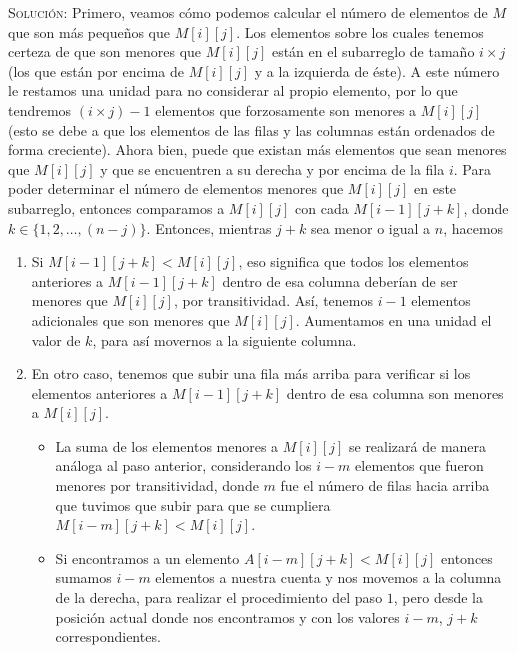\documentclass[letterpaper,11pt]{article}
\begin{document}
\begin{enumerate}
\begin{enumerate}
        \textsc{Solución:} Primero, veamos cómo podemos calcular el número de 
        elementos de $M$ que son más pequeños que $M[i][j]$. Los elementos sobre 
        los cuales tenemos certeza de que son menores que $M[i][j]$ están en el 
        subarreglo de tamaño $i \times j$ (los que están por encima de $M[i][j]$
        y a la izquierda de éste). A este número le restamos una unidad para no 
        considerar al propio elemento, por lo que tendremos $(i \times j) - 1$
        elementos que forzosamente son menores a $M[i][j]$ (esto se debe a que 
        los elementos de las filas y las columnas están ordenados de forma 
        creciente). Ahora bien, puede que existan más elementos que sean menores 
        que $M[i][j]$ y que se encuentren a su derecha y por encima de la fila 
        $i$. Para poder determinar el número de elementos menores que $M[i][j]$
        en este subarreglo, entonces comparamos a $M[i][j]$ con cada 
        $M[i-1][j+k]$, donde $k \in \{1, 2, \ldots, (n-j)\}$. Entonces, mientras 
        $j+k$ sea menor o igual a $n$, hacemos 
        \begin{enumerate}
            \item Si $M[i-1][j+k] < M[i][j]$, eso significa que todos los 
            elementos anteriores a $M[i-1][j+k]$ dentro de esa columna deberían 
            de ser menores que $M[i][j]$, por transitividad. Así, tenemos $i-1$ 
            elementos adicionales que son menores que $M[i][j]$. Aumentamos en 
            una unidad el valor de $k$, para así movernos a la siguiente columna.

            \item En otro caso, tenemos que subir una fila más arriba para 
            verificar si los elementos anteriores a $M[i-1][j+k]$ dentro de esa
            columna son menores a $M[i][j]$.
            \begin{itemize}
                \item La suma de los elementos menores a $M[i][j]$ se realizará 
                de manera análoga al paso anterior, considerando los $i-m$ 
                elementos que fueron menores por transitividad, donde $m$ fue 
                el número de filas hacia arriba que tuvimos que subir para que 
                se cumpliera $M[i-m][j+k] < M[i][j]$.

                \item Si encontramos a un elemento $A[i-m][j+k] < M[i][j]$
                entonces sumamos $i-m$ elementos a nuestra cuenta y nos 
                movemos a la columna de la derecha, para realizar el 
                procedimiento del paso $1$, pero desde la posición actual donde
                nos encontramos y con los valores $i-m$, $j+k$ correspondientes.


\end{itemize}
\end{enumerate}
\end{enumerate}
\end{enumerate}
\end{document}
